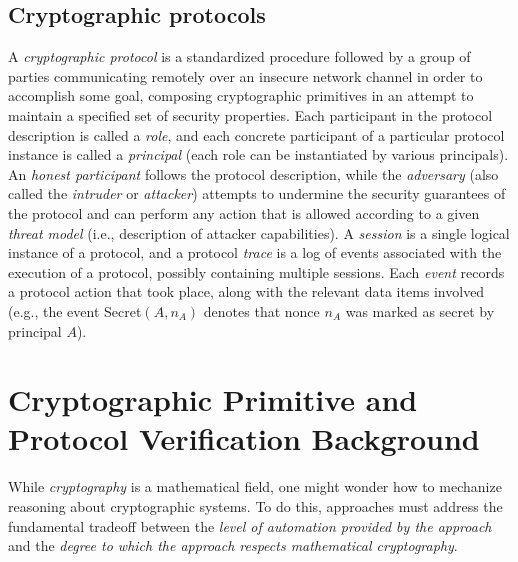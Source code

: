 \documentclass{article}
\theoremstyle{definition}
\begin{document}
\subsection{Cryptographic protocols}

A \emph{cryptographic protocol} is a standardized procedure followed by a group of parties communicating remotely 
over an insecure network channel in order to accomplish some goal, 
composing cryptographic primitives in an attempt to maintain a specified set of security properties. 
Each participant in the protocol description is called a \emph{role}, 
and each concrete participant of a particular protocol instance is called a \emph{principal} 
(each role can be instantiated by various principals). 
An \emph{honest participant} follows the protocol description, 
while the \emph{adversary} (also called the \emph{intruder} or \emph{attacker}) 
attempts to undermine the security guarantees of the protocol and can perform any action 
that is allowed according to a given \emph{threat model} 
(i.e., description of attacker capabilities).  
A \emph{session} is a single logical instance of a protocol, and a protocol \emph{trace} 
is a log of events associated with the execution of a protocol, possibly containing multiple sessions.
Each \emph{event} records a protocol action that took place, along with the relevant data items involved 
(e.g., the event \textsf{Secret}$(A, n_A)$ denotes that nonce $n_A$ was marked as secret by principal $A$).


\section{Cryptographic Primitive and Protocol Verification Background}
While \textit{cryptography} is a mathematical field, one might wonder how to mechanize reasoning 
about cryptographic systems. To do this, approaches must address the fundamental tradeoff between the 
\textit{level of automation provided by the approach} and the 
\textit{degree to which the approach respects mathematical cryptography}.
\end{document}
